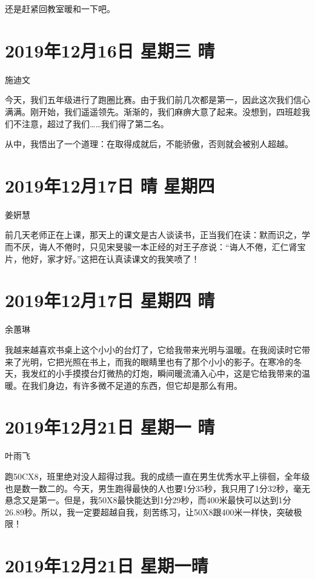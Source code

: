 还是赶紧回教室暖和一下吧。

\section{2019年12月16日 星期三 晴}

施迪文

今天，我们五年级进行了跑圈比赛。由于我们前几次都是第一，因此这次我们信心满满。刚开始，我们遥遥领先。渐渐的，我们麻痹大意了起来。没想到，四班趁我们不注意，超过了我们\ldots\ldots 我们得了第二名。

从中，我悟出了一个道理：在取得成就后，不能骄傲，否则就会被别人超越。

\section{2019年12月17日 晴 星期四}

姜姸慧

前几天老师正在上课，那天上的课文是古人谈读书，正当我们在读：默而识之，学而不厌，诲人不倦时，只见宋旻骏一本正经的对王子彦说：``诲人不倦，汇仁肾宝片，他好，家才好。''这把在认真读课文的我笑喷了！

\section{2019年12月17日 星期四 晴}

余蕙琳

我越来越喜欢书桌上这个小小的台灯了，它给我带来光明与温暖。在我阅读时它带来了光明，它把光照在书上，而我的眼睛里也有了那个小小的影子。在寒冷的冬天，我发红的小手摸摸台灯微热的灯炮，瞬间暖流涌入心中，这是它给我带来的温暖。在我们身边，有许多微不足道的东西，但它却是那么有用。

\section{2019年12月21日 星期一 晴}

叶雨飞

跑50CX8，班里绝对没人超得过我。我的成绩一直在男生优秀水平上徘徊，全年级也是数一数二的。今天，男生跑得最快的人也要1分35秒，我只用了1分32秒，毫无悬念又是第一。但是，我50X8最快能达到1分29秒，而400米最快可以达到1分26.89秒。所以，我一定要超越自我，刻苦练习，让50X8跟400米一样快，突破极限！

\section{2019年12月21日 星期一晴}

